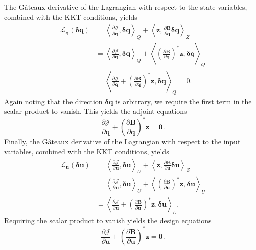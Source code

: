 The G\^{a}teaux derivative of the Lagrangian with respect to the state variables, combined with the KKT conditions, yields
\begin{align}
\mathcal{L}_\mathbf{q}(\boldsymbol \delta \mathbf{q}) &= \left \langle \frac{\partial \mathcal{J}}{\partial \mathbf{q}}, \boldsymbol \delta \mathbf{q} \right \rangle_Q +  \left \langle \mathbf{z},  \frac{\partial \mathbf{B}}{\partial \mathbf{q}} \boldsymbol \delta \mathbf{q} \right \rangle_Z \\
&= \left \langle \frac{\partial \mathcal{J}}{\partial \mathbf{q}}, \boldsymbol \delta \mathbf{q} \right \rangle_Q +  \left \langle \left(  \frac{\partial \mathbf{B}}{\partial \mathbf{q}}\right)^*\mathbf{z},  \boldsymbol \delta \mathbf{q} \right \rangle_Q \\
&= \left \langle \frac{\partial \mathcal{J}}{\partial \mathbf{q}} + \left(  \frac{\partial \mathbf{B}}{\partial \mathbf{q}}\right)^*\mathbf{z},  \boldsymbol \delta \mathbf{q} \right \rangle_Q = 0.
\end{align}
Again noting that the direction $\boldsymbol \delta \mathbf{q}$ is arbitrary, we require the first term in the scalar product to vanish. This yields the adjoint equations
\begin{equation}
\label{eq:adjoint_eq}
\frac{\partial \mathcal{J}}{\partial \mathbf{q}} + \left(  \frac{\partial \mathbf{B}}{\partial \mathbf{q}}\right)^*\mathbf{z} = \mathbf{0}.
\end{equation}
Finally, the G\^{a}teaux derivative of the Lagrangian with respect to the input variables, combined with the KKT conditions, yields
\begin{align}
\mathcal{L}_\mathbf{u}(\boldsymbol \delta \mathbf{u}) &= \left \langle \frac{\partial \mathcal{J}}{\partial \mathbf{u}}, \boldsymbol \delta \mathbf{u} \right \rangle_U +  \left \langle \mathbf{z},  \frac{\partial \mathbf{B}}{\partial \mathbf{u}} \boldsymbol \delta \mathbf{u} \right \rangle_Z \\
&= \left \langle \frac{\partial \mathcal{J}}{\partial \mathbf{u}}, \boldsymbol \delta \mathbf{u} \right \rangle_U +  \left \langle \left(  \frac{\partial \mathbf{B}}{\partial \mathbf{u}}\right)^*\mathbf{z},  \boldsymbol \delta \mathbf{u} \right \rangle_U \\
&= \left \langle \frac{\partial \mathcal{J}}{\partial \mathbf{u}} + \left(  \frac{\partial \mathbf{B}}{\partial \mathbf{u}}\right)^*\mathbf{z},  \boldsymbol \delta \mathbf{u} \right \rangle_U.
\end{align}
Requiring the scalar product to vanish yields the design equations
\begin{equation}
\label{eq:design_eq}
\frac{\partial \mathcal{J}}{\partial \mathbf{u}} + \left(  \frac{\partial \mathbf{B}}{\partial \mathbf{u}}\right)^*\mathbf{z} = \mathbf{0}.
\end{equation}

